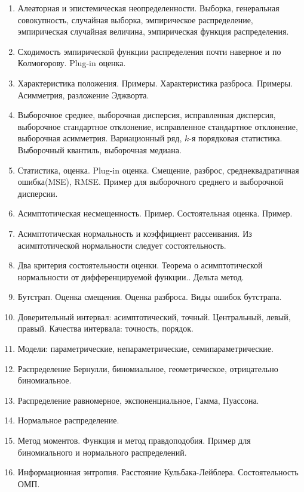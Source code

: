 
\begin{enumerate}
	\item Алеаторная и эпистемическая неопределенности. Выборка, генеральная совокупность, случайная выборка, эмпирическое распределение, эмпирическая случайная величина, эмпирическая функция распределения.
	\item Сходимость эмпирической функции распределения почти наверное и по Колмогорову. Plug-in оценка.
	\item Характеристика положения. Примеры. Характеристика разброса. Примеры. Асимметрия, разложение Эджворта.
	\item Выборочное среднее, выборочная дисперсия, исправленная дисперсия, выборочное стандартное отклонение, исправленное стандартное отклонение, выборочная асимметрия. Вариационный ряд, $k$-я порядковая статистика. Выборочный квантиль, выборочная медиана.
	\item Статистика, оценка. Plug-in оценка. Смещение, разброс, среднеквадратичная ошибка(MSE), RMSE. Пример для выборочного среднего и выборочной дисперсии.
	\item Асимптотическая несмещенность. Пример. Состоятельная оценка. Пример. 
	\item Асимптотическая нормальность и коэффициент рассеивания. Из асимптотической нормальности следует состоятельность.
	\item Два критерия состоятельности оценки. Теорема о асимптотической нормальности от дифференцируемой функции.. Дельта метод.
	\item Бутстрап. Оценка смещения. Оценка разброса. Виды ошибок бутстрапа.
	\item Доверительный интервал: асимптотический, точный. Центральный, левый, правый. Качества интервала: точность, порядок.
	\item Модели: параметрические, непараметрические, семипараметрические. 
	\item Распределение Бернулли, биномиальное, геометрическое, отрицательно биномиальное.
	\item Распределение равномерное, экспоненциальное, Гамма, Пуассона.
	\item Нормальное распределение.
	\item Метод моментов. Функция и метод правдоподобия. Пример для биномиального и нормального распределений.
	\item Информационная энтропия. Расстояние Кульбака-Лейблера. Состоятельность ОМП.


\end{enumerate}

